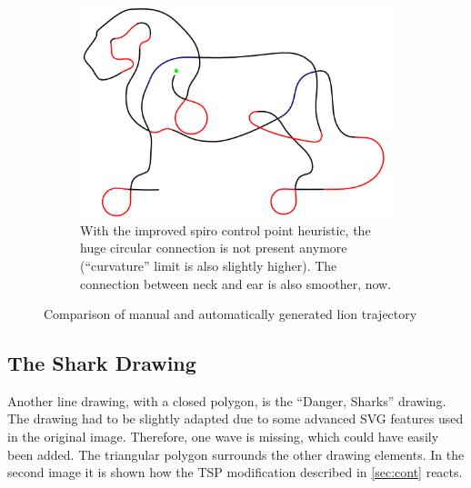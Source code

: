 \begin{figure}[h]
\begin{subfigure}[t]{0.8\textwidth}
	\includegraphics[width=\textwidth]{images/results/lion/lion_new_heuristic2.pdf}
	\caption{With the improved spiro control point heuristic, the huge circular connection is not present anymore (\enquote{curvature} limit is also slightly higher). The connection between neck and ear is also smoother, now.}
\end{subfigure}

\caption{Comparison of manual and automatically generated lion trajectory}
\end{figure}

\clearpage

\subsection{The Shark Drawing}
Another line drawing, with a closed polygon, is the \enquote{Danger, Sharks} drawing. The drawing had to be slightly adapted due to some advanced SVG features used in the original image. Therefore, one wave is missing, which could have easily been added. The triangular polygon surrounds the other drawing elements. In  the second image it is shown how the TSP modification described in \autoref{sec:cont} reacts.

